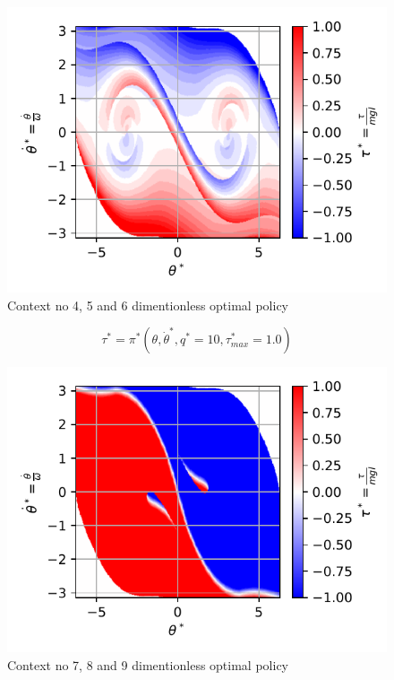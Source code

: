 \begin{figure}[H]
\begin{center}
\includegraphics[width=0.99\linewidth]{fig/c4_dimpolicy.pdf}
\caption{Context no 4, 5 and 6 dimentionless optimal policy}\label{fig:c1_policy}
\end{center}
\end{figure}

\begin{equation}
\tau^*
=
\pi^* \left(
\theta, \dot{\theta}^*,
q^* = 10 , \tau_{max}^* = 1.0
\right)
\end{equation}
\begin{figure}[H]
\begin{center}
\includegraphics[width=0.99\linewidth]{fig/c7_dimpolicy.pdf}
\caption{Context no 7, 8 and 9 dimentionless optimal policy}\label{fig:c1_policy}
\end{center}
\end{figure}












